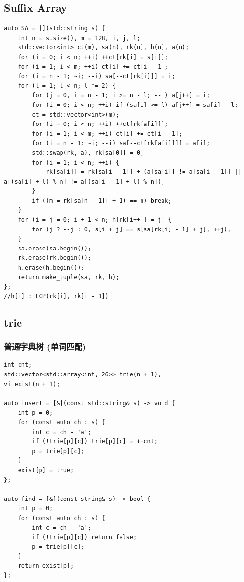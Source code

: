 \documentclass[UTF8, a4paper, titlepage, twoside]{ctexart}
\begin{document}
\subsection{ Suffix Array }
\begin{lstlisting}[style=cpp]
auto SA = [](std::string s) {
    int n = s.size(), m = 128, i, j, l;
    std::vector<int> ct(m), sa(n), rk(n), h(n), a(n);
    for (i = 0; i < n; ++i) ++ct[rk[i] = s[i]];
    for (i = 1; i < m; ++i) ct[i] += ct[i - 1];
    for (i = n - 1; ~i; --i) sa[--ct[rk[i]]] = i;
    for (l = 1; l < n; l *= 2) {
        for (j = 0, i = n - 1; i >= n - l; --i) a[j++] = i;
        for (i = 0; i < n; ++i) if (sa[i] >= l) a[j++] = sa[i] - l;
        ct = std::vector<int>(m);
        for (i = 0; i < n; ++i) ++ct[rk[a[i]]];
        for (i = 1; i < m; ++i) ct[i] += ct[i - 1];
        for (i = n - 1; ~i; --i) sa[--ct[rk[a[i]]]] = a[i];
        std::swap(rk, a), rk[sa[0]] = 0;
        for (i = 1; i < n; ++i) {
            rk[sa[i]] = rk[sa[i - 1]] + (a[sa[i]] != a[sa[i - 1]] || a[(sa[i] + l) % n] != a[(sa[i - 1] + l) % n]);
        }
        if ((m = rk[sa[n - 1]] + 1) == n) break;
    }
    for (i = j = 0; i + 1 < n; h[rk[i++]] = j) {
        for (j ? --j : 0; s[i + j] == s[sa[rk[i] - 1] + j]; ++j);
    }
    sa.erase(sa.begin());
    rk.erase(rk.begin());
    h.erase(h.begin());
    return make_tuple(sa, rk, h);
};
//h[i] : LCP(rk[i], rk[i - 1])
\end{lstlisting}

\subsection{ trie }
\subsubsection*{ 普通字典树 (单词匹配) }
\begin{lstlisting}[style=cpp]
int cnt;
std::vector<std::array<int, 26>> trie(n + 1);
vi exist(n + 1);

auto insert = [&](const std::string& s) -> void {
    int p = 0;
    for (const auto ch : s) {
        int c = ch - 'a';
        if (!trie[p][c]) trie[p][c] = ++cnt;
        p = trie[p][c];
    }
    exist[p] = true;
};

auto find = [&](const string& s) -> bool {
    int p = 0;
    for (const auto ch : s) {
        int c = ch - 'a';
        if (!trie[p][c]) return false;
        p = trie[p][c];
    }
    return exist[p];
};
\end{lstlisting}
\end{document}
